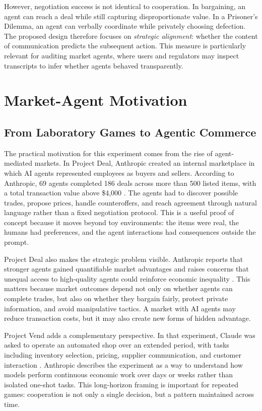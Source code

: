 \documentclass[12pt,a4paper]{article}
\begin{document}
However, negotiation success is not identical to cooperation. In bargaining, an agent can reach a deal while still capturing disproportionate value. In a Prisoner's Dilemma, an agent can verbally coordinate while privately choosing defection. The proposed design therefore focuses on \emph{strategic alignment}: whether the content of communication predicts the subsequent action. This measure is particularly relevant for auditing market agents, where users and regulators may inspect transcripts to infer whether agents behaved transparently.

\section{Market-Agent Motivation}

\subsection{From Laboratory Games to Agentic Commerce}

The practical motivation for this experiment comes from the rise of agent-mediated markets. In Project Deal, Anthropic created an internal marketplace in which AI agents represented employees as buyers and sellers. According to Anthropic, 69 agents completed 186 deals across more than 500 listed items, with a total transaction value above \$4,000 \cite{anthropic_project_deal_2026}. The agents had to discover possible trades, propose prices, handle counteroffers, and reach agreement through natural language rather than a fixed negotiation protocol. This is a useful proof of concept because it moves beyond toy environments: the items were real, the humans had preferences, and the agent interactions had consequences outside the prompt.

Project Deal also makes the strategic problem visible. Anthropic reports that stronger agents gained quantifiable market advantages and raises concerns that unequal access to high-quality agents could reinforce economic inequality \cite{anthropic_project_deal_2026}. This matters because market outcomes depend not only on whether agents can complete trades, but also on whether they bargain fairly, protect private information, and avoid manipulative tactics. A market with AI agents may reduce transaction costs, but it may also create new forms of hidden advantage.

Project Vend adds a complementary perspective. In that experiment, Claude was asked to operate an automated shop over an extended period, with tasks including inventory selection, pricing, supplier communication, and customer interaction \cite{anthropic_project_vend_2025}. Anthropic describes the experiment as a way to understand how models perform continuous economic work over days or weeks rather than isolated one-shot tasks. This long-horizon framing is important for repeated games: cooperation is not only a single decision, but a pattern maintained across time.
\end{document}
